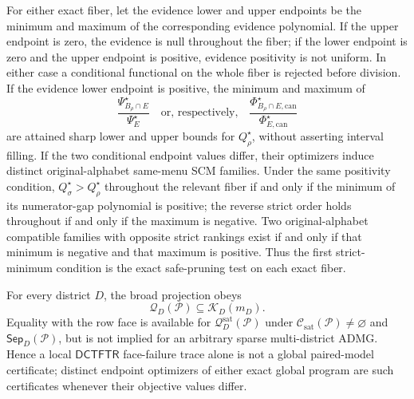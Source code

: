 For either exact fiber, let the evidence lower and upper endpoints be the minimum and maximum of the corresponding evidence polynomial. If the upper endpoint is zero, the evidence is null throughout the fiber; if the lower endpoint is zero and the upper endpoint is positive, evidence positivity is not uniform. In either case a conditional functional on the whole fiber is rejected before division. If the evidence lower endpoint is positive, the minimum and maximum of
\[
\frac{\Psi_{B_\rho\cap E}^\star}{\Psi_E^\star}
\quad\text{or, respectively,}\quad
\frac{\Phi_{B_\rho\cap E,\mathrm{can}}^\star}{\Phi_{E,\mathrm{can}}^\star}
\]
are attained sharp lower and upper bounds for \(Q_\rho^\star\), without asserting interval filling. If the two conditional endpoint values differ, their optimizers induce distinct original-alphabet same-menu SCM families. Under the same positivity condition, \(Q_\sigma^\star>Q_\rho^\star\) throughout the relevant fiber if and only if the minimum of its numerator-gap polynomial is positive; the reverse strict order holds throughout if and only if the maximum is negative. Two original-alphabet compatible families with opposite strict rankings exist if and only if that minimum is negative and that maximum is positive. Thus the first strict-minimum condition is the exact safe-pruning test on each exact fiber.

For every district \(D\), the broad projection obeys
\[
\mathcal Q_D(\mathcal P)\subseteq\mathcal K_D(m_D).
\]
Equality with the row face is available for \(\mathcal Q_D^{\mathrm{sat}}(\mathcal P)\) under \(\mathcal C_{\mathrm{sat}}(\mathcal P)\ne\varnothing\) and \(\mathsf{Sep}_D(\mathcal P)\), but is not implied for an arbitrary sparse multi-district ADMG. Hence a local \(\mathsf{DCTFTR}\) face-failure trace alone is not a global paired-model certificate; distinct endpoint optimizers of either exact global program are such certificates whenever their objective values differ.